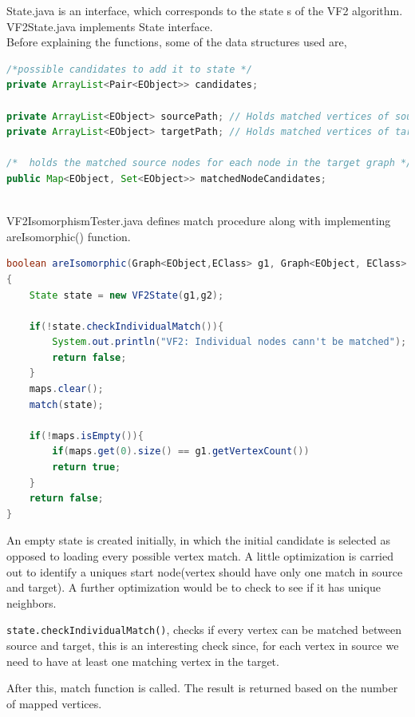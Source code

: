 State.java is an interface, which corresponds to the state s of the VF2 algorithm. VF2State.java implements State interface. 
\\

Before explaining the functions, some of the data structures used are,

\begin{lstlisting}[language = Java,frame = single]
/*possible candidates to add it to state */
private ArrayList<Pair<EObject>> candidates; 
	
private ArrayList<EObject> sourcePath; // Holds matched vertices of source
private ArrayList<EObject> targetPath; // Holds matched vertices of target
	
/*  holds the matched source nodes for each node in the target graph */
public Map<EObject, Set<EObject>> matchedNodeCandidates; 
	
\end{lstlisting}

VF2IsomorphismTester.java defines match procedure along with implementing areIsomorphic() function. 

\begin{lstlisting}[language = Java,frame = single]
boolean areIsomorphic(Graph<EObject,EClass> g1, Graph<EObject, EClass> g2)
{
	State state = new VF2State(g1,g2);
		
	if(!state.checkIndividualMatch()){
		System.out.println("VF2: Individual nodes cann't be matched");
		return false;
	}
	maps.clear();
	match(state);
		
	if(!maps.isEmpty()){
		if(maps.get(0).size() == g1.getVertexCount()) 
		return true;
	}
	return false;
}
\end{lstlisting}


An empty state is created initially, in which the initial candidate is selected as opposed to loading every possible vertex match. A little optimization is carried out to identify a uniques start node(vertex should have only one match in source and target). A further optimization would be to check to see if it has unique neighbors.

\texttt{state.checkIndividualMatch()}, checks if every vertex can be matched between source and target, this is an interesting check since, for each vertex in source we need to have at least one matching vertex in the target.

After this, match function is called. The result is returned based on the number of mapped vertices.

